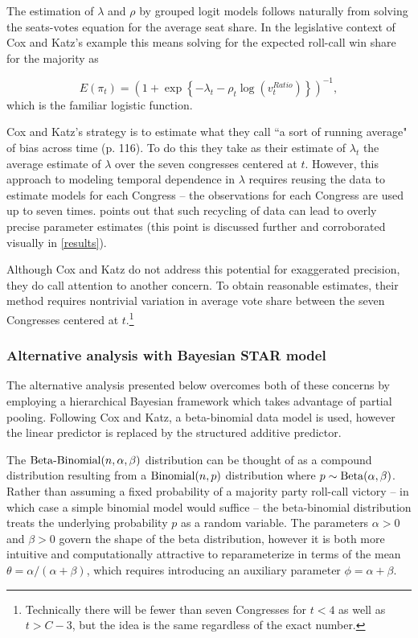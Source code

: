 The estimation of $\lambda$ and $\rho$ by grouped logit models follows naturally from 
solving the seats-votes equation for the average seat share. In the legislative context of 
Cox and Katz's example this means solving for the expected roll-call win share for the 
majority as

\begin{equation*}
  E(\pi_t)  = \left(1 + \exp{\left\{- \lambda_t - \rho_t \log{\left( v_t^{Ratio}  \right)}\right\}}\right)^{-1},
\end{equation*}
%
\noindent which is the familiar logistic function. 

Cox and Katz's strategy is to estimate what they call ``a sort of running average" of bias 
across time (p. 116). To do this they take as their estimate of $\lambda_t$ the average 
estimate of $\lambda$ over the seven congresses centered at $t$. However, this 
approach to modeling temporal dependence in $\lambda$ requires reusing the data 
to estimate models for each Congress -- the observations for each Congress are used 
up to seven times.   points out that such recycling of 
data can lead to overly precise parameter estimates (this point is discussed further and 
corroborated visually in \ref{results}). 

Although Cox and Katz do not address this potential for exaggerated precision, they do 
call attention to another  concern. To obtain reasonable estimates, their method requires 
nontrivial variation in average vote share between the seven Congresses centered at 
$t$.\footnote{Technically there will be fewer than seven Congresses for $t < 4$ as well as 
$t > C- 3$, but the idea is the same regardless of the exact number.}

\subsubsection{Alternative analysis with Bayesian STAR model}
\label{reanalysis}

The alternative analysis presented below overcomes both of these concerns by employing 
a hierarchical Bayesian framework which takes advantage of partial pooling. Following Cox 
and Katz, a beta-binomial data model is used, however the linear predictor is replaced by the 
structured additive predictor. 

The ${\rm Beta\text{-}Binomial}(n,\alpha,\beta)$ distribution can be thought of as a compound 
distribution resulting from a ${\rm Binomial}(n,p)$ distribution where $p \sim {\rm Beta}(\alpha,\beta)$. 
Rather than assuming a fixed probability of a majority party roll-call victory -- in which case a simple 
binomial model would suffice -- the beta-binomial distribution treats the underlying probability $p$ 
as a random variable. The parameters $\alpha > 0$ and $\beta > 0$ govern the shape of the beta 
distribution, however it is both more intuitive and computationally attractive to reparameterize in terms 
of the mean $\theta = \alpha / (\alpha + \beta)$, which requires introducing an auxiliary parameter 
$\phi = \alpha + \beta$. 

